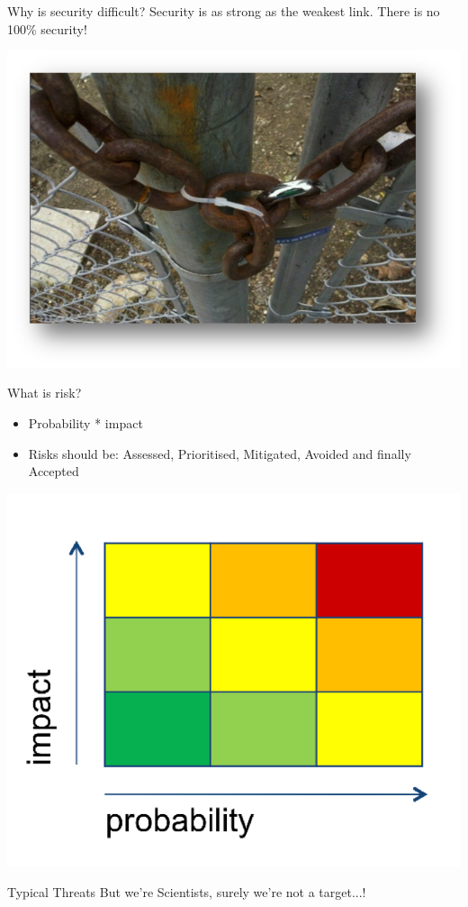 \documentclass{beamer}
\begin{document}
\begin{frame}{Why is security difficult?}
Security is as strong as the weakest link. There is no 100\% security!
\begin{center}
\includegraphics[width=0.8\linewidth]{link.png}
\end{center}
\end{frame}

\begin{frame}{What is risk?}
    \begin{itemize}
		\item Probability * impact
		\item Risks should be: Assessed, Prioritised, Mitigated, Avoided and finally Accepted
	\end{itemize}
    \begin{center} 
      \includegraphics[width=0.45\linewidth]{risk-matrix.png} 
    \end{center}
\end{frame}

\begin{frame}{Typical Threats}
\center 
But we're Scientists, surely we're not a target...! 
\end{frame}
\end{document}
